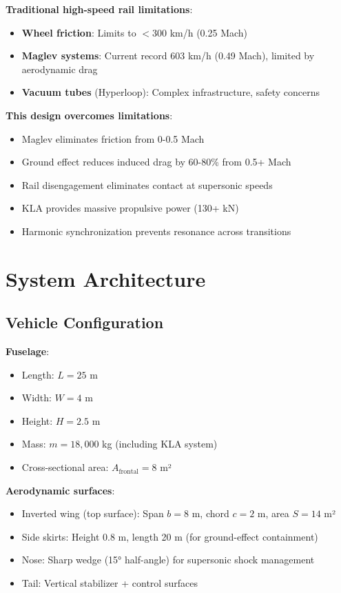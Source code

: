 \documentclass[12pt,a4paper]{article}
\begin{document}
\textbf{Traditional high-speed rail limitations}:
\begin{itemize}
\item \textbf{Wheel friction}: Limits to $<$300 km/h (0.25 Mach)
\item \textbf{Maglev systems}: Current record 603 km/h (0.49 Mach), limited by aerodynamic drag
\item \textbf{Vacuum tubes} (Hyperloop): Complex infrastructure, safety concerns
\end{itemize}

\textbf{This design overcomes limitations}:
\begin{itemize}
\item Maglev eliminates friction from 0-0.5 Mach
\item Ground effect reduces induced drag by 60-80\% from 0.5+ Mach
\item Rail disengagement eliminates contact at supersonic speeds
\item KLA provides massive propulsive power (130+ kN)
\item Harmonic synchronization prevents resonance across transitions
\end{itemize}

\section{System Architecture}

\subsection{Vehicle Configuration}

\textbf{Fuselage}:
\begin{itemize}
\item Length: $L = 25$ m
\item Width: $W = 4$ m
\item Height: $H = 2.5$ m
\item Mass: $m = 18,000$ kg (including KLA system)
\item Cross-sectional area: $A_{\text{frontal}} = 8$ m²
\end{itemize}

\textbf{Aerodynamic surfaces}:
\begin{itemize}
\item Inverted wing (top surface): Span $b = 8$ m, chord $c = 2$ m, area $S = 14$ m²
\item Side skirts: Height 0.8 m, length 20 m (for ground-effect containment)
\item Nose: Sharp wedge (15° half-angle) for supersonic shock management
\item Tail: Vertical stabilizer + control surfaces
\end{itemize}
\end{document}
